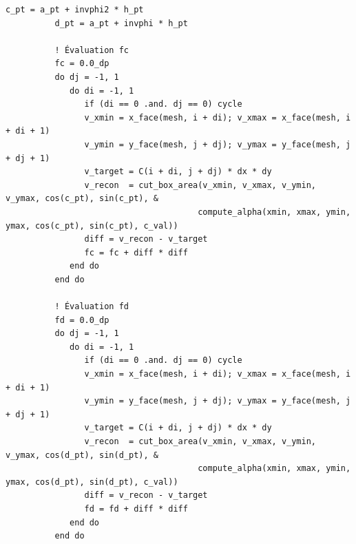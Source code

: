 \documentclass[10pt,a4paper,oneside]{book}
\begin{document}
\begin{lstlisting}[language={[95]Fortran}]
          c_pt = a_pt + invphi2 * h_pt
          d_pt = a_pt + invphi * h_pt

          ! Évaluation fc
          fc = 0.0_dp
          do dj = -1, 1
             do di = -1, 1
                if (di == 0 .and. dj == 0) cycle
                v_xmin = x_face(mesh, i + di); v_xmax = x_face(mesh, i + di + 1)
                v_ymin = y_face(mesh, j + dj); v_ymax = y_face(mesh, j + dj + 1)
                v_target = C(i + di, j + dj) * dx * dy
                v_recon  = cut_box_area(v_xmin, v_xmax, v_ymin, v_ymax, cos(c_pt), sin(c_pt), &
                                       compute_alpha(xmin, xmax, ymin, ymax, cos(c_pt), sin(c_pt), c_val))
                diff = v_recon - v_target
                fc = fc + diff * diff
             end do
          end do

          ! Évaluation fd
          fd = 0.0_dp
          do dj = -1, 1
             do di = -1, 1
                if (di == 0 .and. dj == 0) cycle
                v_xmin = x_face(mesh, i + di); v_xmax = x_face(mesh, i + di + 1)
                v_ymin = y_face(mesh, j + dj); v_ymax = y_face(mesh, j + dj + 1)
                v_target = C(i + di, j + dj) * dx * dy
                v_recon  = cut_box_area(v_xmin, v_xmax, v_ymin, v_ymax, cos(d_pt), sin(d_pt), &
                                       compute_alpha(xmin, xmax, ymin, ymax, cos(d_pt), sin(d_pt), c_val))
                diff = v_recon - v_target
                fd = fd + diff * diff
             end do
          end do


\end{lstlisting}
\end{document}
